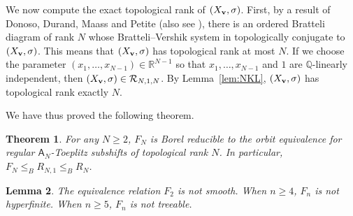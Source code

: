 \documentclass{amsart}
\newtheorem{theorem}{Theorem}[section]
\newtheorem{lemma}[theorem]{Lemma}
\theoremstyle{definition}
\theoremstyle{problem}
\theoremstyle{remark}
\numberwithin{equation}{section}
\begin{document}


We now compute the exact topological rank of $(X_{\bf v},\sigma)$. First, by a result of Donoso, Durand, Maass and Petite \cite[Proposition 4.5]{DDMP} (also see \cite[Proposition 3.6 (ii)]{GLPS}), there is an ordered Bratteli diagram of rank $N$ whose Bratteli--Vershik system in topologically conjugate to $(X_{\bf v}, \sigma)$. This means that $(X_{\bf v},\sigma)$ has topological rank at most $N$. If we choose the parameter $(x_1,\dots, x_{N-1})\in \mathbb{R}^{N-1}$ so that $x_1, \dots, x_{N-1}$ and $1$ are $\mathbb{Q}$-linearly independent, then $(X_{\bf v},\sigma)\in\mathcal{R}_{N,1,N}$. By Lemma~\ref{lem:NKL}, $(X_{\bf v},\sigma)$ has topological rank exactly $N$. 

We have thus proved the following theorem.

\begin{theorem}\label{thm:FN}  For any $N\ge2$, $F_N$ is Borel reducible to the orbit equivalence for regular $\mathsf{A}_N$-Toeplitz subshifts of topological rank $N$. In particular, $F_N\leq_B R_{N,1}\leq_B R_N$.
\end{theorem}

\begin{lemma} The equivalence relation $F_2$ is not smooth. When $n\ge4$, $F_n$ is not hyperfinite. When $n\ge5$, $F_n$ is not treeable.
\end{lemma}
\end{document}
